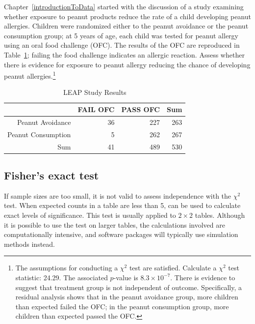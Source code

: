 \begin{exercise} Chapter~\ref{introductionToData} started with the discussion of a study examining whether exposure to peanut products reduce the rate of a child developing peanut allergies. Children were randomized either to the peanut avoidance or the peanut consumption group; at 5 years of age, each child was tested for peanut allergy using an oral food challenge (OFC). The results of the OFC are reproduced in Table~\ref{leapStudyResultsTest}; failing the food challenge indicates an allergic reaction. Assess whether there is evidence for exposure to peanut allergy reducing the chance of developing peanut allergies.\footnote{The assumptions for conducting a $\chi^2$ test are satisfied. Calculate a $\chi^2$ test statistic: 24.29. The associated $p$-value is $8.3 \times 10^{-7}$. There is evidence to suggest that treatment group is not independent of outcome. Specifically, a residual analysis shows that in the peanut avoidance group, more children than expected failed the OFC; in the peanut consumption group, more children than expected passed the OFC.}
	
	\begin{table}[h]
		\centering
		\begin{tabular}{rrrr}
			\hline
			& FAIL OFC & PASS OFC & Sum \\ 
			\hline
			Peanut Avoidance & 36 & 227 & 263 \\ 
			Peanut Consumption & 5 & 262 & 267 \\ 
			Sum & 41 & 489 & 530 \\ 
			\hline
		\end{tabular}
		\caption{LEAP Study Results} 
		\label{leapStudyResultsTest}
	\end{table}
	
	
\end{exercise}

\subsection{Fisher's exact test}

If sample sizes are too small, it is not valid to assess independence with the $\chi^2$ test. When expected counts in a table are less than 5,  can be used to calculate exact levels of significance. This test is usually applied to $2 \times 2$ tables. Although it is possible to use the test on larger tables, the calculations involved are computationally intensive, and software packages will typically use simulation methods instead. 

